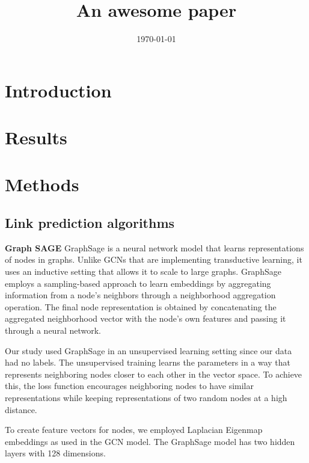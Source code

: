 \documentclass[12pt]{article} %
\begin{document}

\title{An awesome paper} %
\date{\today}
\maketitle %

\section{Introduction}\label{sec:introduction} %



\section{Results}\label{sec:results} %



\section{Methods}\label{sec:methods} %
\subsection{Link prediction algorithms}

\textbf{Graph SAGE}
GraphSage is a neural network model that learns representations of nodes in graphs. Unlike GCNs that are implementing transductive learning, it uses an inductive setting that allows it to scale to large graphs. GraphSage employs a sampling-based approach to learn embeddings by aggregating information from a node's neighbors through a neighborhood aggregation operation. The final node representation is obtained by concatenating the aggregated neighborhood vector with the node's own features and passing it through a neural network.

Our study used GraphSage in an unsupervised learning setting since our data had no labels. The unsupervised training learns the parameters in a way that represents neighboring nodes closer to each other in the vector space. To achieve this, the loss function encourages neighboring nodes to have similar representations while keeping representations of two random nodes at a high distance.

To create feature vectors for nodes, we employed Laplacian Eigenmap embeddings as used in the GCN model. The GraphSage model has two hidden layers with 128 dimensions.


\printbibliography{}
    
\end{document}
